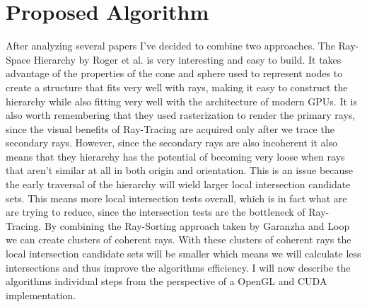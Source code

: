 \documentclass{llncs}
\begin{document}
%
%




%
\section{Proposed Algorithm}
%

After analyzing several papers I've decided to combine two approaches. The Ray-Space Hierarchy by Roger et al. \cite{Roger07} is very interesting and easy to build. It takes advantage of the properties of the cone and sphere used to represent nodes to create a structure that fits very well with rays, making it easy to construct the hierarchy while also fitting very well with the architecture of modern GPUs. It is also worth remembering that they used rasterization to render the primary rays, since the visual benefits of Ray-Tracing are acquired only after we trace the secondary rays. However, since the secondary rays are also incoherent it also means that they hierarchy has the potential of becoming very loose when rays that aren't similar at all  in both origin and orientation. This is an issue because the early traversal of the hierarchy will wield larger local intersection candidate sets. This means more local intersection tests overall, which is in fact what are are trying to reduce, since the intersection tests are the bottleneck of Ray-Tracing. By combining the Ray-Sorting approach taken by Garanzha and Loop \cite{GaranzhaLoop10} we can create clusters of coherent rays. With these clusters of coherent rays the local intersection candidate sets will be smaller which means we will calculate less intersections and thus improve the algorithms efficiency. I will now describe the algorithms individual steps from the perspective of a OpenGL and CUDA implementation.
\end{document}
